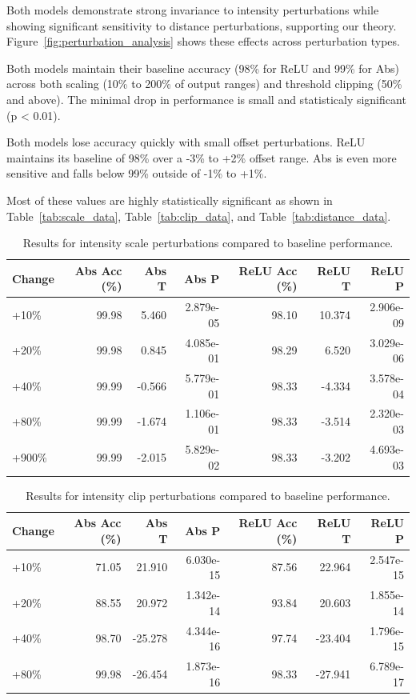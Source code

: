 Both models demonstrate strong invariance to intensity perturbations while showing significant sensitivity to distance perturbations, supporting our theory. Figure~\ref{fig:perturbation_analysis} shows these effects across perturbation types.

Both models maintain their baseline accuracy (98\% for ReLU and 99\% for Abs) across both scaling (10\% to 200\% of output ranges) and threshold clipping (50\% and above). The minimal drop in performance is small and statisticaly significant (p < 0.01). 

Both models lose accuracy quickly with small offset perturbations. ReLU maintains its baseline of 98\% over a -3\% to +2\% offset range. Abs is even more sensitive and falls below 99\% outside of -1\% to +1\%.

Most of these values are highly statistically significant as shown in Table~\ref{tab:scale_data},  Table~\ref{tab:clip_data}, and  Table~\ref{tab:distance_data}.

\begin{table}[h]
    \centering
    \begin{tabular}{lrrrrrr}
    \hline
    Change & Abs Acc (\%) & Abs T & Abs P & ReLU Acc (\%) & ReLU T & ReLU P \\
    \hline
    +10\% & 99.98 & 5.460 & 2.879e-05 & 98.10 & 10.374 & 2.906e-09 \\
    +20\% & 99.98 & 0.845 & 4.085e-01 & 98.29 & 6.520 & 3.029e-06 \\
    +40\% & 99.99 & -0.566 & 5.779e-01 & 98.33 & -4.334 & 3.578e-04 \\
    +80\% & 99.99 & -1.674 & 1.106e-01 & 98.33 & -3.514 & 2.320e-03 \\
    +900\% & 99.99 & -2.015 & 5.829e-02 & 98.33 & -3.202 & 4.693e-03 \\
    \hline
    \end{tabular}
    \caption{Results for intensity scale perturbations compared to baseline performance.}
    \label{fig:scale_data}
\end{table}
    
\begin{table}[h]
    \centering
    \begin{tabular}{lrrrrrr}
    \hline
    Change & Abs Acc (\%) & Abs T & Abs P & ReLU Acc (\%) & ReLU T & ReLU P \\
    \hline
    +10\% & 71.05 & 21.910 & 6.030e-15 & 87.56 & 22.964 & 2.547e-15 \\
    +20\% & 88.55 & 20.972 & 1.342e-14 & 93.84 & 20.603 & 1.855e-14 \\
    +40\% & 98.70 & -25.278 & 4.344e-16 & 97.74 & -23.404 & 1.796e-15 \\
    +80\% & 99.98 & -26.454 & 1.873e-16 & 98.33 & -27.941 & 6.789e-17 \\
    \hline
    \end{tabular}
    \caption{Results for intensity clip perturbations compared to baseline performance.}
    \label{fig:clip_data}
\end{table}

